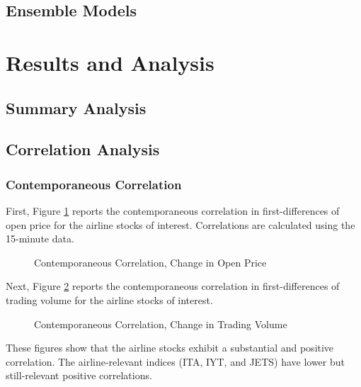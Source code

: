 \documentclass[12pt]{article}
\begin{document}
\subsection{Ensemble Models}

\section{Results and Analysis}
\subsection{Summary Analysis}
\subsection{Correlation Analysis}
\subsubsection{Contemporaneous Correlation}
First, Figure \ref{fig:contemp_open} reports the contemporaneous correlation in first-differences of open price for the airline stocks of interest. Correlations are calculated using the 15-minute data.
\begin{figure}[H]
    \centering
    \caption{Contemporaneous Correlation, Change in Open Price}
    \label{fig:contemp_open}
\end{figure}
Next, Figure \ref{fig:contemp_vol} reports the contemporaneous correlation in first-differences of trading volume for the airline stocks of interest.
\begin{figure}[H]
    \centering
    \caption{Contemporaneous Correlation, Change in Trading Volume}
    \label{fig:contemp_vol}
\end{figure}
These figures show that the airline stocks exhibit a substantial and positive correlation. The airline-relevant indices (ITA, IYT, and JETS) have lower but still-relevant positive correlations. 
\end{document}
